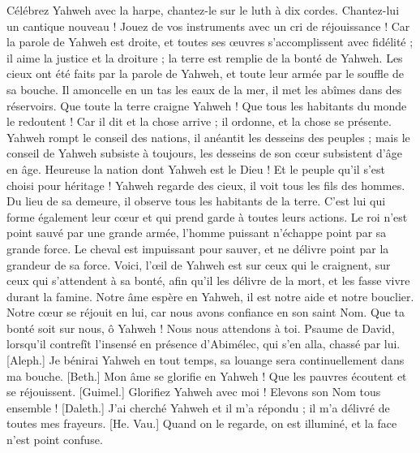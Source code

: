 \begin{multicols}{2}
Célébrez Yahweh avec la harpe, chantez-le sur le luth à dix cordes.
Chantez-lui un cantique nouveau ! Jouez de vos instruments avec un cri de réjouissance !
Car la parole de Yahweh est droite, et toutes ses œuvres s’accomplissent avec fidélité ;
il aime la justice et la droiture ; la terre est remplie de la bonté de Yahweh.
Les cieux ont été faits par la parole de Yahweh, et toute leur armée par le souffle de sa bouche.
Il amoncelle en un tas les eaux de la mer, il met les abîmes dans des réservoirs.
Que toute la terre craigne Yahweh ! Que tous les habitants du monde le redoutent !
Car il dit et la chose arrive ; il ordonne, et la chose se présente.
Yahweh rompt le conseil des nations, il anéantit les desseins des peuples ;
mais le conseil de Yahweh subsiste à toujours, les desseins de son cœur subsistent d'âge en âge.
Heureuse la nation dont Yahweh est le Dieu ! Et le peuple qu'il s'est choisi pour héritage !
Yahweh regarde des cieux, il voit tous les fils des hommes.
Du lieu de sa demeure, il observe tous les habitants de la terre.
C'est lui qui forme également leur cœur et qui prend garde à toutes leurs actions.
Le roi n'est point sauvé par une grande armée, l'homme puissant n'échappe point par sa grande force.
Le cheval est impuissant pour sauver, et ne délivre point par la grandeur de sa force.
Voici, l'œil de Yahweh est sur ceux qui le craignent, sur ceux qui s'attendent à sa bonté,
afin qu'il les délivre de la mort, et les fasse vivre durant la famine.
Notre âme espère en Yahweh, il est notre aide et notre bouclier.
Notre cœur se réjouit en lui, car nous avons confiance en son saint Nom.
Que ta bonté soit sur nous, ô Yahweh ! Nous nous attendons à toi.
\VerseOne{}Psaume de David, lorsqu’il contrefît l’insensé en présence d'Abimélec, qui s’en alla, chassé par lui.
[Aleph.] Je bénirai Yahweh en tout temps, sa louange sera continuellement dans ma bouche.
[Beth.] Mon âme se glorifie en Yahweh ! Que les pauvres écoutent et se réjouissent.
[Guimel.] Glorifiez Yahweh avec moi ! Elevons son Nom tous ensemble !
[Daleth.] J'ai cherché Yahweh et il m'a répondu ; il m'a délivré de toutes mes frayeurs.
[He. Vau.] Quand on le regarde, on est illuminé, et la face n’est point confuse.

\end{multicols}
